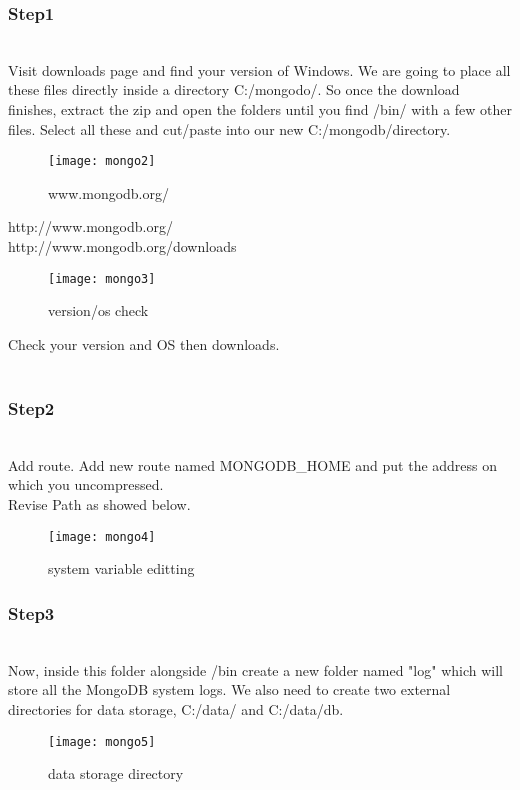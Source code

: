 \documentclass[conference,compsoc, twocolumn]{IEEEtran}
\begin{document}
\subsubsection{Step1}\\
Visit downloads page and find your version of Windows. We are going to place all these files directly inside a directory C:/mongodo/. So once the download finishes, extract the zip and open the folders until you find /bin/ with a few other files. Select all these and cut/paste into our new C:/mongodb/directory.
\begin{figure}[H]
\centering\texttt{[image: mongo2]}
\caption{www.mongodb.org/}
\end{figure}
http://www.mongodb.org/ \\
http://www.mongodb.org/downloads\\
\begin{figure}[H]
\centering\texttt{[image: mongo3]}
\caption{version/os check}
\end{figure}
Check your version and OS then downloads.\\ \\


\subsubsection{Step2}\\
Add route. Add new route named MONGODB\_HOME and put the address on which you uncompressed.\\
Revise Path as showed below.
\begin{figure}[H]
\centering\texttt{[image: mongo4]}
\caption{system variable editting}
\end{figure}

\subsubsection{Step3}\\
Now, inside this folder alongside /bin create a new folder named "log" which will store all the MongoDB system logs. We also need to create two external directories for data storage, C:/data/ and C:/data/db.
\begin{figure}[H]
\centering\texttt{[image: mongo5]}
\caption{data storage directory}
\end{figure}
\end{document}
